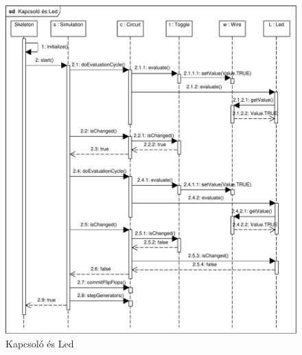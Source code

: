 \begin{figure}[H]
\begin{center}
\includegraphics[width=17cm]{chapters/chapter05/imgs/test1.pdf}
\caption{Kapcsoló és Led}
\label{fig:test1}
\end{center}
\end{figure}

